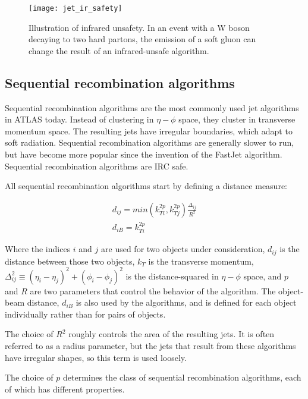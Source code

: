 \begin{figure}[h!]
    \centering
\texttt{[image: jet\_ir\_safety]}
\caption{Illustration of infrared unsafety.
In an event with a W boson decaying to two hard partons, the emission of a soft gluon can change the result of an infrared-unsafe algorithm.}
\label{fig:jet_ir_safety}
\end{figure}\cite{jet-jetography}

\subsection{Sequential recombination algorithms}\label{subec:jet_seq_recombination}

Sequential recombination algorithms are the most commonly used jet algorithms in ATLAS today.
Instead of clustering in $\eta-\phi$ space, they cluster in transverse momentum space.
The resulting jets have irregular boundaries, which adapt to soft radiation.
Sequential recombination algorithms are generally slower to run,
but have become more popular since the invention of the FastJet\cite{jet-fastjet} algorithm.
Sequential recombination algorithms are IRC safe.

All sequential recombination algorithms start by defining a distance measure:

\begin{align}\label{eq:jet_distance}
    d_{ij} = min\left(k_{Ti}^{2p}, k_{Tj}^{2p}\right)\frac{\Delta_{ij}}{R^2} \\
    d_{iB} = k_{Ti}^{2p}
\end{align}

Where the indices $i$ and $j$ are used for two objects under consideration,
$d_{ij}$ is the distance between those two objects, $k_T$ is the transverse momentum,
$\Delta_{ij}^2 \equiv (\eta_i-\eta_j)^2 + (\phi_i-\phi_j)^2$ is the distance-squared in $\eta-\phi$ space,
and $p$ and $R$ are two parameters that control the behavior of the algorithm.
The object-beam distance, $d_{iB}$ is also used by the algorithms, and is defined for each object individually rather than for pairs of objects.

The choice of $R^2$ roughly controls the area of the resulting jets.
It is often referred to as a radius parameter, but the jets that result from these algorithms have irregular shapes,
so this term is used loosely.

The choice of $p$ determines the class of sequential recombination algorithms, each of which has different properties.

